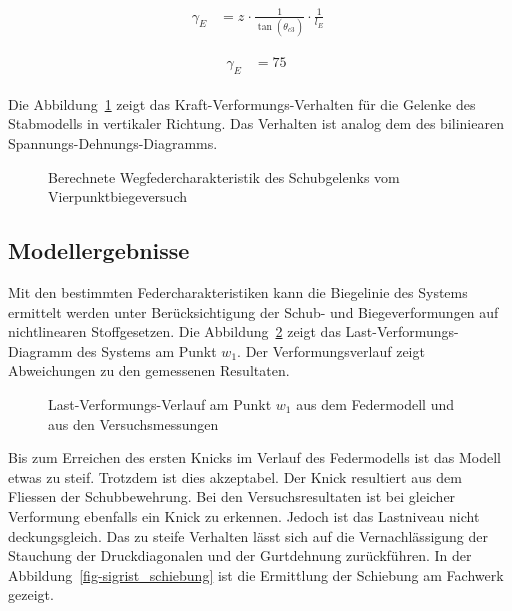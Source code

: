 \documentclass[
  11pt,
  letterpaper,
]{scrreprt}
\begin{document}
$$
\begin{aligned}
\gamma_{E_{_{}}} &= z_{_{}} \cdot \frac{ 1 }{ \tan \left( \theta_{c3_{_{}}} \right) } \cdot \frac{1} { l_{E} } \; 
\end{aligned}
$$

$$
\begin{aligned}
\gamma_{E_{_{}}} &= 75\ \;
\end{aligned}
$$

Die Abbildung~\ref{fig-wegfeder-schub-sv14} zeigt das
Kraft-Verformungs-Verhalten für die Gelenke des Stabmodells in
vertikaler Richtung. Das Verhalten ist analog dem des biliniearen
Spannungs-Dehnungs-Diagramms.

\begin{figure}[H]


\caption{\label{fig-wegfeder-schub-sv14}Berechnete
Wegfedercharakteristik des Schubgelenks vom Vierpunktbiegeversuch}

\end{figure}%

\subsection{Modellergebnisse}\label{modellergebnisse-1}

Mit den bestimmten Federcharakteristiken kann die Biegelinie des Systems
ermittelt werden unter Berücksichtigung der Schub- und Biegeverformungen
auf nichtlinearen Stoffgesetzen. Die Abbildung~\ref{fig-l-w-sv14} zeigt
das Last-Verformungs-Diagramm des Systems am Punkt \(w_1\). Der
Verformungsverlauf zeigt Abweichungen zu den gemessenen Resultaten.

\begin{figure}[H]


\caption{\label{fig-l-w-sv14}Last-Verformungs-Verlauf am Punkt \(w_1\)
aus dem Federmodell und aus den Versuchsmessungen}

\end{figure}%

Bis zum Erreichen des ersten Knicks im Verlauf des Federmodells ist das
Modell etwas zu steif. Trotzdem ist dies akzeptabel. Der Knick
resultiert aus dem Fliessen der Schubbewehrung. Bei den
Versuchsresultaten ist bei gleicher Verformung ebenfalls ein Knick zu
erkennen. Jedoch ist das Lastniveau nicht deckungsgleich. Das zu steife
Verhalten lässt sich auf die Vernachlässigung der Stauchung der
Druckdiagonalen und der Gurtdehnung zurückführen. In der
Abbildung~\ref{fig-sigrist_schiebung} ist die Ermittlung der Schiebung
am Fachwerk gezeigt.
\end{document}
